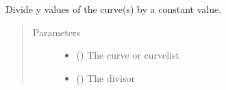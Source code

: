 \documentclass[letterpaper,10pt,english]{sphinxmanual}
\begin{document}
\begin{fulllineitems}
\label{\detokenize{pydv:pydvpy.divy}}
Divide y values of the curve(s) by a constant value.

\begin{sphinxVerbatim}[commandchars=\\\{\}]
  
\end{sphinxVerbatim}

\begin{sphinxVerbatim}[commandchars=\\\{\}]
 
\end{sphinxVerbatim}
\begin{quote}\begin{description}
\item[{Parameters}] \leavevmode\begin{itemize}
\item {} 
 ({\hyperref[\detokenize{pydv:curve.Curve}]{}}) \textendash{} The curve or curvelist

\item {} 
 () \textendash{} The divisor

\end{itemize}

\end{description}\end{quote}

\end{fulllineitems}

\end{document}

